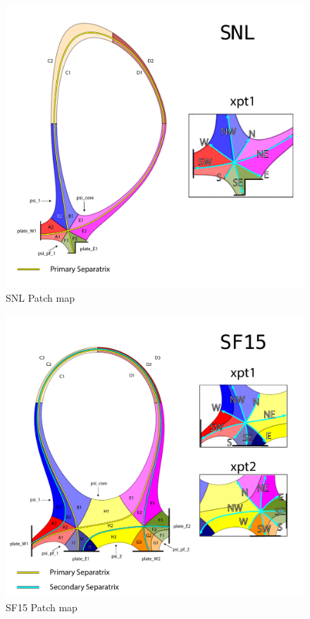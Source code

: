 \begin{figure}[H]
    \centering
        \includegraphics[width=\textwidth]{figures/configurations/SNL_collection.pdf}
        \caption{SNL Patch map}
        \label{fig:snl_patch_map}
\end{figure}
\begin{figure}[H]
    \centering
        \includegraphics[width=\textwidth]{figures/configurations/SF15_collection.pdf}
        \caption{SF15 Patch map}
        \label{fig:sf15_patch_map}
\end{figure}
